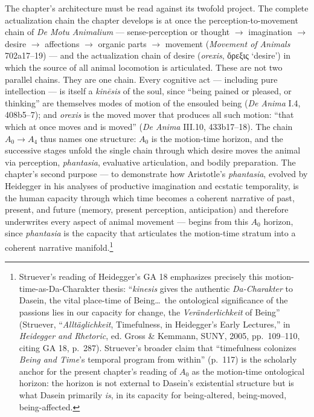 \documentclass{article}
\newcommand{\gk}[1]{{\greekfont #1}}
\begin{document}
The chapter's architecture must be read against its twofold project. The complete actualization chain the chapter develops is at once the perception-to-movement chain of \textit{De Motu Animalium} --- sense-perception or thought $\rightarrow$ imagination $\rightarrow$ desire $\rightarrow$ affections $\rightarrow$ organic parts $\rightarrow$ movement (\textit{Movement of Animals} 702a17--19) --- and the actualization chain of desire (\textit{orexis}, \gk{ὄρεξις} `desire') in which the source of all animal locomotion is articulated. These are not two parallel chains. They are one chain. Every cognitive act --- including pure intellection --- is itself a \textit{kinēsis} of the soul, since ``being pained or pleased, or thinking'' are themselves modes of motion of the ensouled being (\textit{De Anima} I.4, 408b5--7); and \textit{orexis} is the moved mover that produces all such motion: ``that which at once moves and is moved'' (\textit{De Anima} III.10, 433b17--18). The chain $A_0 \rightarrow A_4$ thus names one structure: $A_0$ is the motion-time horizon, and the successive stages unfold the single chain through which desire moves the animal via perception, \textit{phantasia}, evaluative articulation, and bodily preparation. The chapter's second purpose --- to demonstrate how Aristotle's \textit{phantasia}, evolved by Heidegger in his analyses of productive imagination and ecstatic temporality, is the human capacity through which time becomes a coherent narrative of past, present, and future (memory, present perception, anticipation) and therefore underwrites every aspect of animal movement --- begins from this $A_0$ horizon, since \textit{phantasia} is the capacity that articulates the motion-time stratum into a coherent narrative manifold.\footnote{Struever's reading of Heidegger's GA 18 emphasizes precisely this motion-time-as-Da-Charakter thesis: ``\textit{kinesis} gives the authentic \textit{Da-Charakter} to Dasein, the vital place-time of Being\ldots\ the ontological significance of the passions lies in our capacity for change, the \textit{Veränderlichkeit} of Being'' (Struever, ``\textit{Alltäglichkeit}, Timefulness, in Heidegger's Early Lectures,'' in \textit{Heidegger and Rhetoric}, ed. Gross \& Kemmann, SUNY, 2005, pp.~109--110, citing GA 18, p.~287). Struever's broader claim that ``timefulness colonizes \textit{Being and Time}'s temporal program from within'' (p.~117) is the scholarly anchor for the present chapter's reading of $A_0$ as the motion-time ontological horizon: the horizon is not external to Dasein's existential structure but is what Dasein primarily \textit{is}, in its capacity for being-altered, being-moved, being-affected.}
\end{document}
